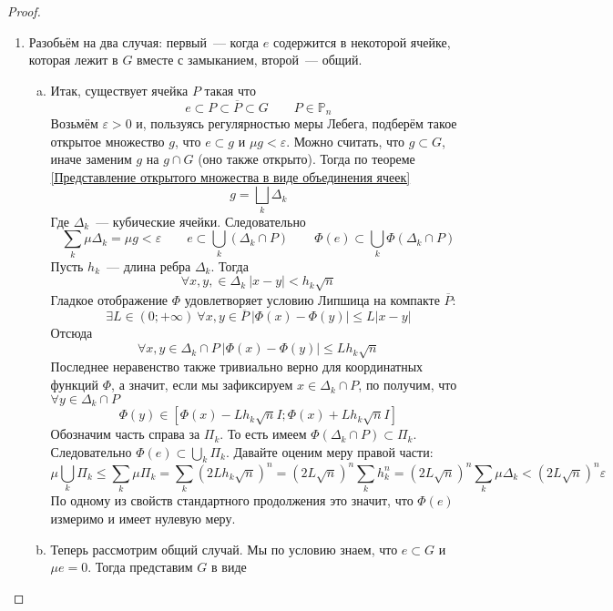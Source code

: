 \documentclass{article}
\let\eps\varepsilon
\begin{document}
    \begin{proof}
        \begin{enumerate}
            \item Разобьём на два случая: первый~--- когда $e$ содержится в некоторой ячейке, которая лежит в $G$ вместе с замыканием, второй~--- общий.
            \begin{enumerate}[a.]
                \item Итак, существует ячейка $P$ такая что
                $$
                e\subset P\subset\overline P\subset G\qquad P\in\mathbb P_n
                $$
                Возьмём $\eps>0$ и, пользуясь регулярностью меры Лебега, подберём такое открытое множество $g$, что $e\subset g$ и $\mu g<\eps$. Можно считать, что $g\subset G$, иначе заменим $g$ на $g\cap G$ (оно также открыто). Тогда по теореме \ref{Представление открытого множества в виде объединения ячеек}
                $$
                g=\bigsqcup_k\Delta_k
                $$
                Где $\Delta_k$~--- кубические ячейки. Следовательно
                $$
                \sum\limits_k\mu\Delta_k=\mu g<\eps\qquad e\subset\bigcup\limits_k(\Delta_k\cap P)\qquad\Phi(e)\subset\bigcup\limits_k\Phi(\Delta_k\cap P)
                $$
                Пусть $h_k$~--- длина ребра $\Delta_k$. Тогда
                $$\forall x,y,\in\Delta_k~|x-y|<h_k\sqrt n$$
                Гладкое отображение $\Phi$ удовлетворяет условию Липшица на компакте $\overline P$:
                $$
                \exists L\in(0;+\infty)~\forall x,y\in\overline P~|\Phi(x)-\Phi(y)|\leqslant L|x-y|
                $$
                Отсюда
                $$
                \forall x,y\in\Delta_k\cap P~|\Phi(x)-\Phi(y)|\leqslant Lh_k\sqrt n
                $$
                Последнее неравенство также тривиально верно для координатных функций $\Phi$, а значит, если мы зафиксируем $x\in\Delta_k\cap P$, по получим, что $\forall y\in\Delta_k\cap P$
                $$
                \Phi(y)\in[\Phi(x)-Lh_k\sqrt nI;\Phi(x)+Lh_k\sqrt nI]
                $$
                Обозначим часть справа за $\Pi_k$. То есть имеем $\Phi(\Delta_k\cap P)\subset\Pi_k$. Следовательно $\Phi(e)\subset\bigcup\limits_k\Pi_k$. Давайте оценим меру правой части:
                $$
                \mu\bigcup\limits_k\Pi_k\leqslant\sum\limits_k\mu\Pi_k=\sum\limits_k(2Lh_k\sqrt n)^n=(2L\sqrt n)^n\sum\limits_kh_k^n=(2L\sqrt n)^n\sum\limits_k\mu\Delta_k<(2L\sqrt n)^n\eps
                $$
                По одному из свойств стандартного продолжения это значит, что $\Phi(e)$ измеримо и имеет нулевую меру.
                \item Теперь рассмотрим общий случай. Мы по условию знаем, что $e\subset G$ и $\mu e=0$. Тогда представим $G$ в виде

\end{enumerate}
\end{enumerate}
\end{proof}
\end{document}
